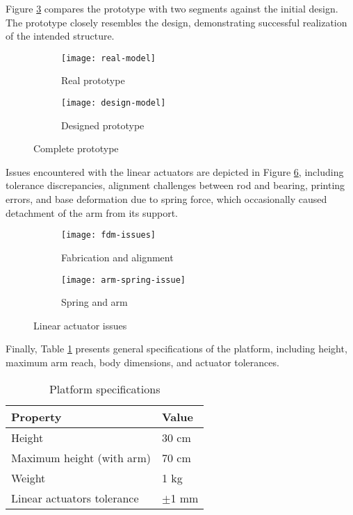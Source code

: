 Figure \ref{fig:complete-prototype} compares the prototype with two segments against the initial design. The prototype closely resembles the design, demonstrating successful realization of the intended structure.

\begin{figure}[H]
    \centering
    \begin{subfigure}[b]{0.3\textwidth}
        \texttt{[image: real-model]}
        \caption{Real prototype}
        \label{fig:real-model}
    \end{subfigure}
    \begin{subfigure}[b]{0.3\textwidth}
        \texttt{[image: design-model]}
        \caption{Designed prototype}
        \label{fig:design-model}
    \end{subfigure}
    \caption{Complete prototype}
    \label{fig:complete-prototype}
\end{figure}

Issues encountered with the linear actuators are depicted in Figure \ref{fig:manufacturing-issues}, including tolerance discrepancies, alignment challenges between rod and bearing, printing errors, and base deformation due to spring force, which occasionally caused detachment of the arm from its support.

\begin{figure}[H]
    \centering
    \begin{subfigure}[t]{0.6\textwidth}
        \texttt{[image: fdm-issues]}
        \caption{Fabrication and alignment}
        \label{fig:fdm-issues}
    \end{subfigure}
    \begin{subfigure}[t]{0.3\textwidth}
        \texttt{[image: arm-spring-issue]}
        \caption{Spring and arm}
        \label{fig:arm-spring-issue}
    \end{subfigure}
    \caption{Linear actuator issues}
    \label{fig:manufacturing-issues}
\end{figure}


Finally, Table \ref{tab:platform-specifications} presents general specifications of the platform, including height, maximum arm reach, body dimensions, and actuator tolerances.

\begin{table}[h]
    \centering
    \caption{Platform specifications}
    \label{tab:platform-specifications}
    \begin{tabular}{ll}
    \toprule
    Property & Value \\
    \midrule
    Height  & 30 cm \\
    Maximum height (with arm) & 70 cm \\
    Weight & 1 kg \\
    Linear actuators tolerance & $\pm$1 mm \\
    \bottomrule
    \end{tabular}
\end{table}